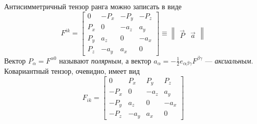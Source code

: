     Антисимметричный тензор  ранга можно записать в виде
    \[
        F^{ik} = \begin{bmatrix}
            0 & -P_x & -P_y & -P_z \\
            P_x & 0 & -a_z & a_y \\
            P_y & a_z & 0 & -a_x \\
            P_z & -a_y & a_x & 0
        \end{bmatrix} \equiv \begin{Vmatrix}
            \vec{P} & \vec{a}
        \end{Vmatrix}
    \]
    Вектор $P_{\alpha} = F^{\alpha 0}$ называют \textit{полярным}, а вектор $a_{\alpha} = -\frac 12 e_{\alpha\beta\gamma} F^{\beta\gamma}$ --- \textit{аксиальным}.
    Ковариантный тензор, очевидно, имеет вид
    \[
        F_{ik} = \begin{bmatrix}
            0 & P_x & P_y & P_z \\
            -P_x & 0 & -a_z & a_y \\
            -P_y & a_z & 0 & -a_x \\
            -P_z & -a_y & a_x & 0
        \end{bmatrix}
    \]
